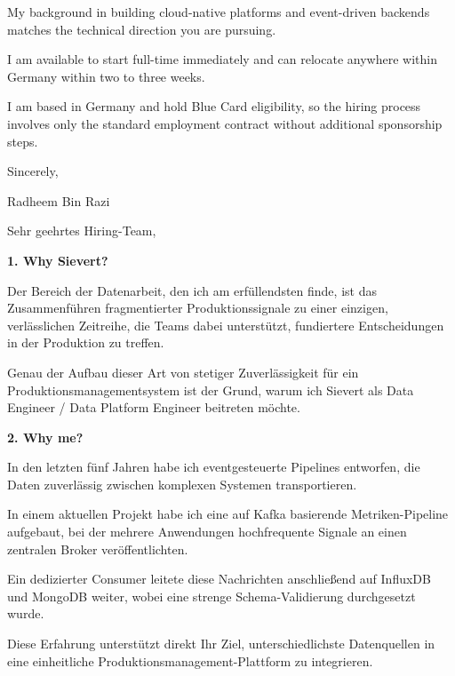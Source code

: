 \documentclass[11pt,a4paper]{coverletter}
\begin{document}
My background in building cloud-native platforms and event-driven backends matches the technical direction you are pursuing.

I am available to start full-time immediately and can relocate anywhere within Germany within two to three weeks.

I am based in Germany and hold Blue Card eligibility, so the hiring process involves only the standard employment contract without additional sponsorship steps.

\closing{Sincerely,}{Radheem Bin Razi}

\clearpage
{}


\opening{Sehr geehrtes Hiring-Team,}

\vspace{8pt}\noindent\textbf{1. Why Sievert?}\par\vspace{3pt}

Der Bereich der Datenarbeit, den ich am erfüllendsten finde, ist das Zusammenführen fragmentierter Produktionssignale zu einer einzigen, verlässlichen Zeitreihe, die Teams dabei unterstützt, fundiertere Entscheidungen in der Produktion zu treffen.

Genau der Aufbau dieser Art von stetiger Zuverlässigkeit für ein Produktionsmanagementsystem ist der Grund, warum ich Sievert als Data Engineer / Data Platform Engineer beitreten möchte.

\vspace{8pt}\noindent\textbf{2. Why me?}\par\vspace{3pt}

In den letzten fünf Jahren habe ich eventgesteuerte Pipelines entworfen, die Daten zuverlässig zwischen komplexen Systemen transportieren.

In einem aktuellen Projekt habe ich eine auf Kafka basierende Metriken-Pipeline aufgebaut, bei der mehrere Anwendungen hochfrequente Signale an einen zentralen Broker veröffentlichten.

Ein dedizierter Consumer leitete diese Nachrichten anschließend auf InfluxDB und MongoDB weiter, wobei eine strenge Schema-Validierung durchgesetzt wurde.

Diese Erfahrung unterstützt direkt Ihr Ziel, unterschiedlichste Datenquellen in eine einheitliche Produktionsmanagement-Plattform zu integrieren.
\end{document}
